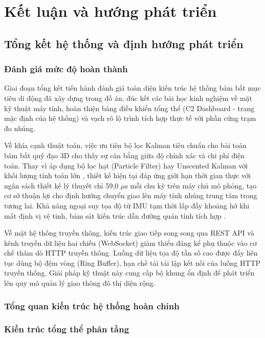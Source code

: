 \section{Kết luận và hướng phát triển}

\subsection{Tổng kết hệ thống và định hướng phát triển}

\subsubsection{Đánh giá mức độ hoàn thành}

\hspace{0.5cm} Giai đoạn tổng kết tiến hành đánh giá toàn diện kiến trúc hệ thống bám bắt mục tiêu di động đã xây dựng trong đồ án, đúc kết các bài học kinh nghiệm về mặt kỹ thuật máy tính, hoàn thiện bảng điều khiển tổng thể (C2 Dashboard - trang mặc định của hệ thống) và vạch rõ lộ trình tích hợp thực tế với phần cứng trạm đo nhúng.


Về khía cạnh thuật toán, việc ưu tiên bộ lọc Kalman tiêu chuẩn cho bài toán bám bắt quỹ đạo 3D cho thấy sự cân bằng giữa độ chính xác và chi phí điện toán. Thay vì áp dụng bộ lọc hạt (Particle Filter) hay Unscented Kalman với khối lượng tính toán lớn \cite{simon2006optimal}, thiết kế hiện tại đáp ứng giới hạn thời gian thực với ngân sách thiết kế lý thuyết chỉ 59{,}0 $\mu$s mỗi chu kỳ trên máy chủ mô phỏng, tạo cơ sở thuận lợi cho định hướng chuyển giao lên máy tính nhúng trung tâm trong tương lai. Khả năng ngoại suy tọa độ từ IMU tạm thời lấp đầy khoảng hở khi mất định vị vệ tinh, bám sát kiến trúc dẫn đường quán tính tích hợp \cite{farrell2008aided}.

Về mặt hệ thống truyền thông, kiến trúc giao tiếp song song qua REST API và kênh truyền dữ liệu hai chiều (WebSocket) giảm thiểu đáng kể phụ thuộc vào cơ chế thăm dò HTTP truyền thống. Luồng dữ liệu tọa độ tần số cao được đẩy liên tục dùng bộ đệm vòng (Ring Buffer), hạn chế tải tái lập kết nối của luồng HTTP truyền thống. Giải pháp kỹ thuật này cung cấp bộ khung ổn định để phát triển lên quy mô quản lý giao thông đô thị diện rộng.

\subsubsection{Tổng quan kiến trúc hệ thống hoàn chỉnh}

\subsubsection{Kiến trúc tổng thể phân tầng}


